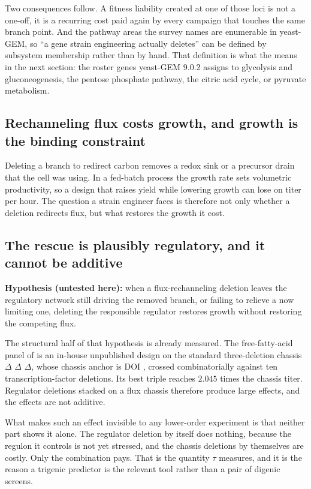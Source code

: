 Two consequences follow. A fitness liability created at one of those loci is not
a one-off, it is a recurring cost paid again by every campaign that touches the
same branch point. And the pathway areas the survey names are enumerable in
yeast-GEM, so ``a gene strain engineering actually deletes'' can be defined by
subsystem membership rather than by hand. That definition is what the
 means in the next section: the roster genes yeast-GEM
9.0.2 assigns to glycolysis and gluconeogenesis, the pentose phosphate pathway,
the citric acid cycle, or pyruvate metabolism.

\subsection{Rechanneling flux costs growth, and growth is the binding constraint}

Deleting a branch to redirect carbon removes a redox sink or a precursor drain
that the cell was using. In a fed-batch process the growth rate sets volumetric
productivity, so a design that raises yield while lowering growth can lose on
titer per hour. The question a strain engineer faces is therefore not only
whether a deletion redirects flux, but what restores the growth it cost.

\subsection{The rescue is plausibly regulatory, and it cannot be additive}

\textbf{Hypothesis (untested here):} when a flux-rechanneling deletion leaves the
regulatory network still driving the removed branch, or failing to relieve a now
limiting one, deleting the responsible regulator restores growth without
restoring the competing flux.

The structural half of that hypothesis is already measured. The free-fatty-acid
panel of \protect{} is an in-house unpublished design
on the standard three-deletion chassis $\Delta$ $\Delta$
$\Delta$, whose chassis anchor is DOI
\protect{}, crossed combinatorially against ten
transcription-factor deletions. Its best triple reaches $2.045$ times the chassis
titer. Regulator deletions stacked on a flux chassis therefore produce large
effects, and the effects are not additive.

What makes such an effect invisible to any lower-order experiment is that neither
part shows it alone. The regulator deletion by itself does nothing, because the
regulon it controls is not yet stressed, and the chassis deletions by themselves
are costly. Only the combination pays. That is the quantity $\tau$ measures, and
it is the reason a trigenic predictor is the relevant tool rather than a pair of
digenic screens.

